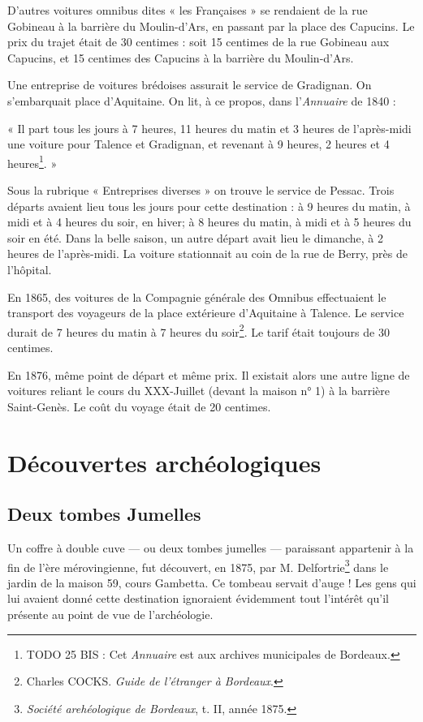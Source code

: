 \documentclass[a4paper,11pt]{book}
\begin{document}
D'autres voitures omnibus dites « les Françaises » se rendaient de la rue Gobineau à la barrière du Moulin-d'Ars, en passant par la place des Capucins. Le prix du trajet était de 30 centimes : soit 15 centimes de la rue Gobineau aux Capucins, et 15 centimes des Capucins à la barrière du Moulin-d'Ars.

Une entreprise de voitures brédoises assurait le service de Gradignan. On s'embarquait place d'Aquitaine. On lit, à ce propos, dans l'\textit{Annuaire} de 1840 :

« Il part tous les jours à 7 heures, 11 heures du matin et 3 heures de l'après-midi une voiture pour Talence et Gradignan, et revenant à 9 heures, 2 heures et 4 heures\footnote[25 bis]{TODO 25 BIS : Cet \textit{Annuaire} est aux archives municipales de Bordeaux.}. »

Sous la rubrique « Entreprises diverses » on trouve le service de Pessac. Trois départs avaient lieu tous les jours pour cette destination : à 9 heures du matin, à midi et à 4 heures du soir, en hiver; à 8 heures du matin, à midi et à 5 heures du soir en été. Dans la belle saison, un autre départ avait lieu le dimanche, à 2 heures de l'après-midi. La voiture stationnait au coin de la rue de Berry, près de l'hôpital.

En 1865, des voitures de la Compagnie générale des Omnibus effectuaient le transport des voyageurs de la place extérieure d'Aquitaine à Talence. Le service durait de 7 heures du matin à 7 heures du soir\footnote{Charles \textsc{COCKS}. \textit{Guide de l'étranger à Bordeaux}.}. Le tarif était toujours de 30 centimes.

En 1876, même point de départ et même prix. Il existait alors une autre ligne de voitures reliant le cours du XXX-Juillet (devant la maison n° 1) à la barrière Saint-Genès. Le coût du voyage était de 20 centimes.

\section{Découvertes archéologiques}
\subsection{Deux tombes Jumelles}

Un coffre à double cuve — ou deux tombes jumelles — paraissant appartenir à la fin de l'ère mérovingienne, fut découvert, en 1875, par M. Delfortrie\footnote{\textit{Société arehéologique de Bordeaux}, t. II, année 1875.}  dans le jardin de la maison 59, cours Gambetta. Ce tombeau servait d'auge ! Les gens qui lui avaient donné cette destination ignoraient évidemment tout l'intérêt qu'il présente au point de vue de l'archéologie.
\end{document}
